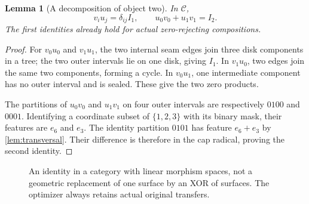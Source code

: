 \documentclass[11pt,a4paper]{article}
\newtheorem{lemma}[lemma]{Lemma}
\theoremstyle{definition}
\begin{document}
\begin{lemma}[A decomposition of object two]\label{lem:split}
In $\mathcal C$,
\begin{equation}
v_i u_j=\delta_{ij}I_1,
\qquad u_0v_0+u_1v_1=I_2.
\label{eq:split}
\end{equation}
The first identities already hold for actual zero-rejecting compositions.
\end{lemma}
\begin{proof}
For $v_0u_0$ and $v_1u_1$, the two internal seam edges join three disk components in a tree; the two outer intervals lie on one disk, giving $I_1$. In $v_1u_0$, two edges join the same two components, forming a cycle. In $v_0u_1$, one intermediate component has no outer interval and is sealed. These give the two zero products.

The partitions of $u_0v_0$ and $u_1v_1$ on four outer intervals are respectively $0100$ and $0001$. Identifying a coordinate subset of $\{1,2,3\}$ with its binary mask, their features are $e_6$ and $e_3$. The identity partition $0101$ has feature $e_6+e_3$ by \cref{lem:transversal}. Their difference is therefore in the cap radical, proving the second identity.
\end{proof}

\begin{figure}[ht]
\centering
{}
\caption{An identity in a category with linear morphism spaces, not a geometric replacement of one surface by an XOR of surfaces. The optimizer always retains actual original transfers.}
\label{fig:split}
\end{figure}
\end{document}
